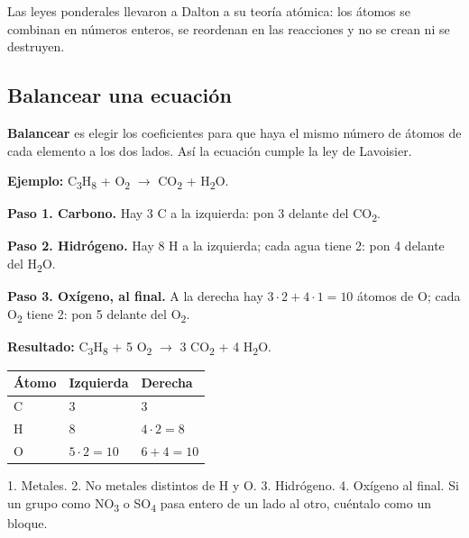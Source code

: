 \begin{clave} Las leyes ponderales llevaron a Dalton a su teoría atómica: los átomos se combinan en números enteros, se reordenan en las reacciones y no se crean ni se destruyen.\end{clave}
\subsection{Balancear una ecuación}
\textbf{Balancear} es elegir los coeficientes para que haya el mismo número de átomos de cada elemento a los dos lados. Así la ecuación cumple la ley de Lavoisier.

 

\textbf{Ejemplo:} C\textsubscript{3}H\textsubscript{8} + O\textsubscript{2} \ensuremath{\rightarrow} CO\textsubscript{2} + H\textsubscript{2}O.

 

\textbf{Paso 1. Carbono.} Hay 3 C a la izquierda: pon 3 delante del CO\textsubscript{2}.

 

\textbf{Paso 2. Hidrógeno.} Hay 8 H a la izquierda; cada agua tiene 2: pon 4 delante del H\textsubscript{2}O.

 

\textbf{Paso 3. Oxígeno, al final.} A la derecha hay $3\cdot 2 + 4\cdot 1 = 10$ átomos de O; cada O\textsubscript{2} tiene 2: pon 5 delante del O\textsubscript{2}.

 

\textbf{Resultado:} C\textsubscript{3}H\textsubscript{8} + 5 O\textsubscript{2} \ensuremath{\rightarrow} 3 CO\textsubscript{2} + 4 H\textsubscript{2}O.

 
\begin{center}\small
\begin{tabular}{@{}lll@{}}
\toprule
\textbf{Átomo} & \textbf{Izquierda} & \textbf{Derecha} \\
\midrule
C & 3 & 3 \\
H & 8 & $4\cdot 2 = 8$ \\
O & $5\cdot 2 = 10$ & $6 + 4 = 10$ \\
\bottomrule
\end{tabular}
\end{center}
  
\begin{clave} 1. Metales. 2. No metales distintos de H y O. 3. Hidrógeno. 4. Oxígeno al final. Si un grupo como NO\textsubscript{3} o SO\textsubscript{4} pasa entero de un lado al otro, cuéntalo como un bloque.\end{clave}
 

